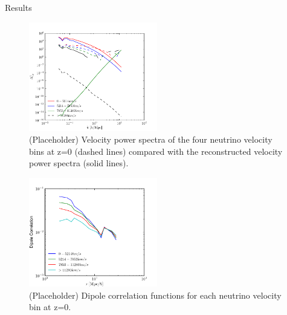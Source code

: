 \begin{section}{Results}
\begin{figure}[htbp]
  \begin{center}
    \includegraphics[width=0.5\textwidth]{./figures/VelPowerSpectra/velpower.pdf}
    \caption{(Placeholder) Velocity power spectra of the four neutrino velocity
	      bins at z=0 (dashed lines) compared with the reconstructed velocity
	      power spectra (solid lines).}
    \label{fig:velpowerfig}
  \end{center}
\end{figure}


\begin{figure}[htbp]
  \begin{center}
    \includegraphics[width=0.5\textwidth]{./figures/Dipole/dipolefig.pdf}
    \caption{(Placeholder) Dipole correlation functions for each neutrino
	      velocity bin at z=0.}
    \label{fig:dipolefig}
  \end{center}
\end{figure}


\end{section}
